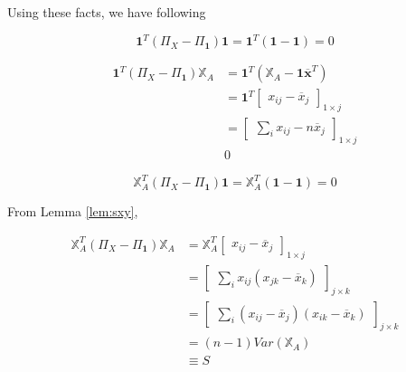 \documentclass[]{book}
\theoremstyle{definition}
\theoremstyle{definition}
\theoremstyle{definition}
\theoremstyle{remark}
\begin{document}
Using these facts, we have following

\begin{equation} \label{eq:mssrquad1}
  \mathbf{1}^T (\Pi_X - \Pi_{\mathbf{1}}) \mathbf{1} = \mathbf{1}^T (\mathbf{1} - \mathbf{1}) = 0
\end{equation}

\begin{equation} \label{eq:mssrquad2}
  \begin{split}
    \mathbf{1}^T (\Pi_X - \Pi_{\mathbf{1}}) \mathbb{X}_A & = \mathbf{1}^T (\mathbb{X}_A - \mathbf{1} \mathbf{\overline{x}}^T) \\
    & = \mathbf{1}^T \begin{bmatrix}
      x_{ij} - \overline{x}_j
    \end{bmatrix}_{1 \times j} \\
    & = \begin{bmatrix}
      \sum_i x_{ij} - n \overline{x}_j
    \end{bmatrix}_{1 \times j} \\
    & 0
  \end{split}
\end{equation}

\begin{equation} \label{eq:mssrquad3}
  \mathbb{X}_A^T (\Pi_X - \Pi_{\mathbf{1}}) \mathbf{1} = \mathbb{X}_A^T (\mathbf{1} - \mathbf{1}) = 0
\end{equation}

From Lemma \ref{lem:sxy},

\begin{equation} \label{eq:mssrquad4}
  \begin{split}
    \mathbb{X}_A^T (\Pi_X - \Pi_{\mathbf{1}}) \mathbb{X}_A & = \mathbb{X}_A^T \begin{bmatrix}
      x_{ij} - \overline{x}_j
    \end{bmatrix}_{1 \times j} \\
    & = \begin{bmatrix}
      \sum_i x_{ij}(x_{jk} - \overline{x}_k)
    \end{bmatrix}_{j \times k} \\
    & = \begin{bmatrix}
      \sum_i (x_{ij} - \overline{x}_j) (x_{ik} - \overline{x}_k)
    \end{bmatrix}_{j \times k} \\
    & = (n - 1) Var(\mathbb{X}_A) \\
    & \equiv S
  \end{split}
\end{equation}
\end{document}
